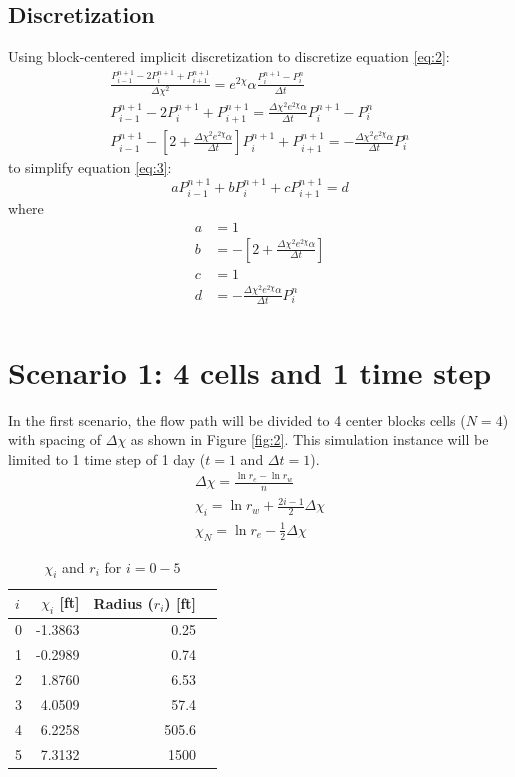 \documentclass[12pt,letterpaper,titlepage]{article}
\begin{document}
\subsection{Discretization}
Using block-centered implicit discretization to discretize equation \ref{eq:2}:
\begin{gather}
\frac{P^{n+1}_{i-1}-2P^{n+1}_{i}+P^{n+1}_{i+1}}{\Delta\chi^2}= e^{2\chi}\alpha \frac{P^{n+1}_{i}-P^{n}_{i}}{\Delta t}\\
{P^{n+1}_{i-1}-2P^{n+1}_{i}+P^{n+1}_{i+1}} =\frac{\Delta\chi^2e^{2\chi}\alpha}{\Delta t} {P^{n+1}_{i}-P^{n}_{i}}\\
{P^{n+1}_{i-1}-[2+\frac{\Delta\chi^2e^{2\chi}\alpha}{\Delta t}]P^{n+1}_{i}+P^{n+1}_{i+1}} =-\frac{\Delta\chi^2e^{2\chi}\alpha}{\Delta t} P^n_i\label{eq:3}
\end{gather}
to simplify equation \ref{eq:3}:\\
\begin{equation}
a{P^{n+1}_{i-1}+b P^{n+1}_{i}+c P^{n+1}_{i+1}} =d
\end{equation}
where 
\begin{align*}
a &=1\\
b &=-[2+\frac{\Delta\chi^2e^{2\chi}\alpha}{\Delta t}]\\
c &=1\\
d &=-\frac{\Delta\chi^2e^{2\chi}\alpha}{\Delta t}P^n_i\\
\end{align*}
\section{Scenario 1: 4 cells and 1 time step}

In the first scenario, the flow path will be divided to 4 center blocks cells ($N=4$) with spacing of $\Delta\chi$ as shown in Figure \ref{fig:2}. This simulation instance will be limited to 1 time step of 1 day ($t=1$ and $\Delta t=1$). 
\begin{gather}\label{eq:dx}
\Delta\chi=\frac{\ln{r_e}-\ln{r_w}}{n}\\\label{eq:dx2}
\chi_i=\ln{r_w}+\frac{2i-1}{2}\Delta\chi\\\label{eq:dx3}
\chi_N=\ln{r_e}-\frac{1}{2}\Delta\chi
\end{gather}
\begin{table}[h]
\centering
\begin{tabular}{lrrr}
$i$  & $\chi_i$ [ft]& Radius ($r_i$) [ft]  \\\hline
0 &-1.3863 & 0.25\\
1& -0.2989 & 0.74\\
2& 1.8760 & 6.53\\
3 &4.0509 & 57.4\\
4& 6.2258 & 505.6\\
5& 7.3132 & 1500\\
\hline
\end{tabular}
\caption{\label{tab:4}$\chi_i$ and $r_i$ for $i=0-5$}
\end{table}
\end{document}
